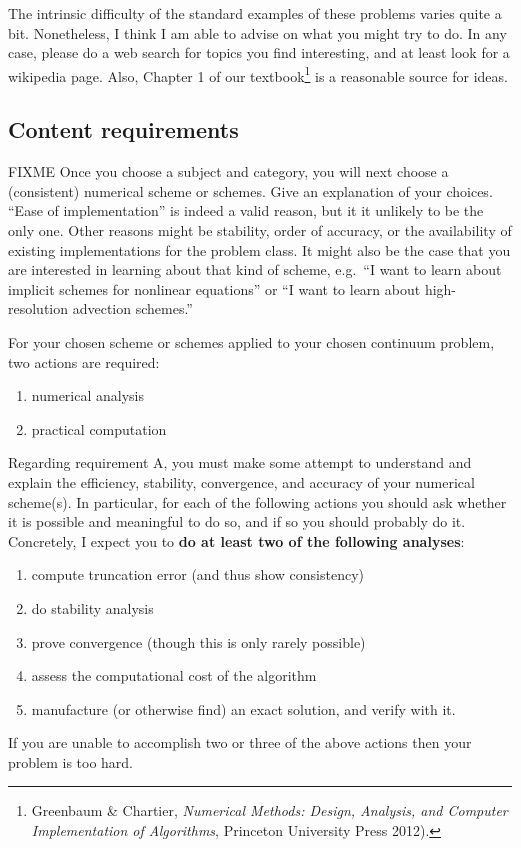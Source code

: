 \documentclass[11pt]{amsart}
\begin{document}
\medskip \noindent The intrinsic difficulty of the standard examples of these problems varies quite a bit. Nonetheless, I think I am able to advise on what you might try to do.  In any case, please do a web search for topics you find interesting, and at least look for a wikipedia page.  Also, Chapter 1 of our textbook\footnote{Greenbaum \& Chartier, \emph{Numerical Methods: Design, Analysis, and Computer Implementation of Algorithms}, Princeton University Press 2012).} is a reasonable source for ideas.

\subsection*{Content requirements}  FIXME Once you choose a subject and category, you will next choose a (consistent) numerical scheme or schemes.  Give an explanation of your choices.  ``Ease of implementation'' is indeed a valid reason, but it it unlikely to be the only one.  Other reasons might be stability, order of accuracy, or the availability of existing implementations for the problem class.  It might also be the case that you are interested in learning about that kind of scheme, e.g.~``I want to learn about implicit schemes for nonlinear equations'' or ``I want to learn about high-resolution advection schemes.''

For your chosen scheme or schemes applied to your chosen continuum problem, two actions are required:
\renewcommand{\labelenumi}{\Alph{enumi}.}
\begin{enumerate}
\item numerical analysis
\item practical computation
\end{enumerate}

Regarding requirement A, you must make some attempt to understand and explain the efficiency, stability, convergence, and accuracy of your numerical scheme(s).  In particular, for each of the following actions you should ask whether it is possible and meaningful to do so, and if so you should probably do it.  Concretely, I expect you to \textbf{do at least two of the following analyses}:
\renewcommand{\labelenumi}{\roman{enumi}.}
\begin{enumerate}
\item compute truncation error (and thus show consistency)
\item do stability analysis
\item prove convergence (though this is only rarely possible)
\item assess the computational cost of the algorithm
\item manufacture (or otherwise find) an exact solution, and verify with it.
\end{enumerate}
If you are unable to accomplish two or three of the above actions then your problem is too hard.
\end{document}
